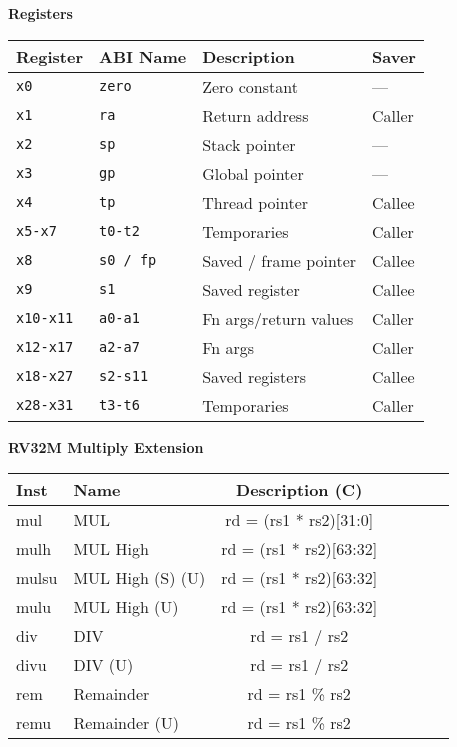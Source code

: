 \begin{multicols}{2}
        
\columnbreak

\textbf{Registers}\\

\begin{tabular} {|l | l | l | l|} \hline
Register     & ABI Name     & Description           & Saver  \\ \hline
\tt{x0}      & \tt{zero}    & Zero constant         & ---    \\
\tt{x1}      & \tt{ra}      & Return address        & Caller \\
\tt{x2}      & \tt{sp}      & Stack pointer         & ---    \\
\tt{x3}      & \tt{gp}      & Global pointer        & ---    \\
\tt{x4}      & \tt{tp}      & Thread pointer        & Callee \\
\tt{x5-x7}   & \tt{t0-t2}   & Temporaries           & Caller \\
\tt{x8}      & \tt{s0 / fp} & Saved / frame pointer & Callee \\
\tt{x9}      & \tt{s1}      & Saved register        & Callee \\
\tt{x10-x11} & \tt{a0-a1}   & Fn args/return values & Caller \\
\tt{x12-x17} & \tt{a2-a7}   & Fn args               & Caller \\
\tt{x18-x27} & \tt{s2-s11}  & Saved registers       & Callee \\
\tt{x28-x31} & \tt{t3-t6}   & Temporaries           & Caller \\ \hline
\end{tabular}
\end{multicols}

\textbf{RV32M Multiply Extension}\\
\begin{tabular}
    {|T | l | c | T | T | T | C } \hline
    \rm Inst & Name              & \rm Description (C)     \\ \hline
    mul      & MUL               & rd = (rs1 * rs2)[31:0]  \\
    mulh     & MUL High          & rd = (rs1 * rs2)[63:32] \\
    mulsu    & MUL High (S) (U)  & rd = (rs1 * rs2)[63:32] \\
    mulu     & MUL High (U)      & rd = (rs1 * rs2)[63:32] \\
    div      & DIV               & rd = rs1 / rs2          \\
    divu     & DIV (U)           & rd = rs1 / rs2          \\
    rem      & Remainder         & rd = rs1 \% rs2         \\
    remu     & Remainder (U)     & rd = rs1 \% rs2         \\
    \hline
\end{tabular}